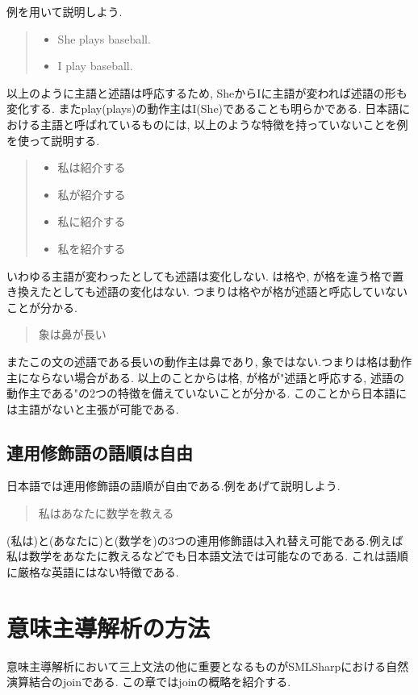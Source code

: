 \documentclass{jreport}
\begin{document}
例を用いて説明しよう.

\begin{quote}
 \begin{itemize}
  \item She plays baseball.
  \item I play baseball.
 \end{itemize}
\end{quote}

以上のように主語と述語は呼応するため, SheからIに主語が変われば述語の形も変化する.
またplay(plays)の動作主はI(She)であることも明らかである.
日本語における主語と呼ばれているものには, 以上のような特徴を持っていないことを例を使って説明する.

\begin{quote}
 \begin{itemize}
  \item 私は紹介する
  \item 私が紹介する
  \item 私に紹介する
  \item 私を紹介する
 \end{itemize}
\end{quote}

いわゆる主語が変わったとしても述語は変化しない. は格や, が格を違う格で置き換えたとしても述語の変化はない.
つまりは格やが格が述語と呼応していないことが分かる.

\begin{quote}
    象は鼻が長い
\end{quote}

またこの文の述語である長いの動作主は鼻であり, 象ではない.つまりは格は動作主にならない場合がある.
以上のことからは格, が格が"述語と呼応する, 述語の動作主である"の2つの特徴を備えていないことが分かる.
このことから日本語には主語がないと主張が可能である.

\section{連用修飾語の語順は自由}
日本語では連用修飾語の語順が自由である.例をあげて説明しよう.

\begin{quote}
    私はあなたに数学を教える
\end{quote}

(私は)と(あなたに)と(数学を)の3つの連用修飾語は入れ替え可能である.例えば
私は数学をあなたに教えるなどでも日本語文法では可能なのである. これは語順に厳格な英語にはない特徴である.

\chapter{意味主導解析の方法}
意味主導解析において三上文法の他に重要となるものがSMLSharpにおける自然演算結合のjoinである.
この章ではjoinの概略を紹介する.
\end{document}
